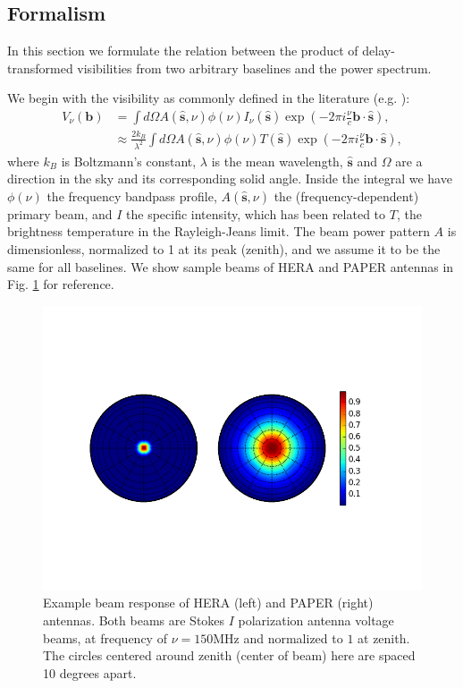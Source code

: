 \documentclass[twocolumn,apj,numberedappendix]{emulateapj}
\renewcommand\[{\begin{equation}}
\renewcommand\]{\end{equation}}
\begin{document}
\subsection{Formalism}
In this section we formulate the relation between 
the product of delay-transformed visibilities from two arbitrary baselines and the power spectrum. 

We begin with the visibility as commonly defined in the literature (e.g.
\citealt{TMS, first-paper}): 
\begin{equation}
\begin{aligned}V_{\nu}(\boldsymbol{b}) & =\int d\Omega A(\hat{\boldsymbol{s}},\nu)\phi(\nu)I_{\nu}(\hat{\boldsymbol{s}})\exp\left(-2\pi i\frac{\nu}{c}\boldsymbol{b}\cdot\hat{\boldsymbol{s}}\right),\\
 & \approx\frac{2k_{B}}{\lambda^{2}}\int d\Omega A(\hat{\boldsymbol{s}},\nu)\phi(\nu)T(\hat{\boldsymbol{s}})\exp\left(-2\pi i\frac{\nu}{c}\boldsymbol{b}\cdot\hat{\boldsymbol{s}}\right),
\end{aligned}
\label{eq:Vis1}
\end{equation}
where $k_B$ is Boltzmann's constant, $\lambda$ is the mean wavelength, $\hat{\boldsymbol{s}}$ and $\Omega$ are a direction in the
sky and its corresponding solid angle. Inside the integral we have $\phi(\nu)$ the frequency bandpass profile, $A(\hat{\boldsymbol{s}},\nu)$ the (frequency-dependent) primary beam, and $I$ the specific intensity, which has been
related to $T$, the brightness temperature in the Rayleigh-Jeans
limit. The beam power pattern $A$ is dimensionless,
normalized to 1 at its peak (zenith), and we assume it to be the same
for all baselines. We show sample beams of HERA and PAPER antennas in Fig. \ref{fig:Beam} for reference. 



\begin{figure}[H]
\includegraphics[width=1.2\linewidth]{Beams}

\caption{Example beam response of HERA (left) and PAPER (right) antennas. Both beams are Stokes $I$ polarization antenna voltage beams, at frequency of $\nu=150\text{MHz}$ and normalized to $1$ at zenith. The circles centered around zenith (center of beam) here are
spaced 10 degrees apart. \label{fig:Beam}}
\end{figure}
\end{document}
